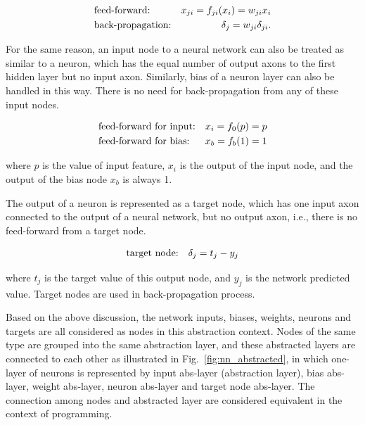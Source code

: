 \documentclass[procedia]{easychair}
\begin{document}
\begin{align}
    & \text{feed-forward:} & x_{ji} = f_{ji}(x_i) = w_{ji}x_i \notag \\
    & \text{back-propagation:} & \delta_j = w_{ji}\delta_{ji} \text{.} \notag
\end{align}

For the same reason, an input node to a neural network can also be treated as similar to a neuron, which has the equal number of output axons to the first hidden layer but no input axon.  Similarly, bias of a neuron layer can also be handled in this way.  There is no need for back-propagation from any of these input nodes.

\begin{align}
	& \text{feed-forward for input:} & x_i = f_0(p) = p \notag \\
	& \text{feed-forward for bias:} & x_b = f_b(1) = 1 \notag
\end{align}

where $p$ is the value of input feature, $x_i$ is the output of the input node, and the output of the bias node $x_b$ is always 1.

The output of a neuron is represented as a target node, which has one input axon connected to the output of a neural network, but no output axon, i.e., there is no feed-forward from a target node.

\begin{align}
    & \text{target node:} & \delta_j = t_j - y_j \notag
\end{align}

where $t_j$ is the target value of this output node, and $y_j$ is the network predicted value.  Target nodes are used in back-propagation process.

Based on the above discussion, the network inputs, biases, weights, neurons and targets are all considered as nodes in this abstraction context.  Nodes of the same type are grouped into the same abstraction layer, and these abstracted layers are connected to each other as illustrated in Fig.~\ref{fig:nn_abstracted}, in which one-layer of neurons is represented by input abs-layer (abstraction layer), bias abs-layer, weight abs-layer, neuron abs-layer and target node abs-layer.  The connection among nodes and abstracted layer are considered equivalent in the context of programming.
\end{document}
